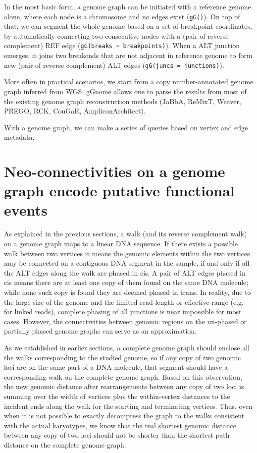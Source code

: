 \documentclass[phd,tocprelim]{cornell}
\begin{document}
In the most basic form, a genome graph can be initiated with a reference genome alone, where each node is a chromosome and no edges exist (\texttt{gG()}). On top of that, we can segment the whole genome based on a set of breakpoint coordinates, by automatically connecting two consecutive nodes with a (pair of reverse complement) REF edge (\texttt{gG(breaks = breakpoints)}). When a ALT junction emerges, it joins two breakends that are not adjacent in reference genome to form new (pair of reverse complement) ALT edges (\texttt{gG(juncs = junctions)}).

More often in practical scenarios, we start from a copy number-annotated genome graph inferred from WGS. gGnome allows one to parse the results from most of the existing genome graph reconstruction methods (JaBbA, ReMixT, Weaver, PREGO, RCK, CouGaR, AmpliconArchitect). 

With a genome graph, we can make a series of queries based on vertex and edge metadata.

\section{Neo-connectivities on a genome graph encode putative functional events}

As explained in the previous sections, a walk (and its reverse complement walk) on a genome graph maps to a linear DNA sequence. If there exists a possible walk between two vertices it means the genomic elements within the two vertices may be connected on a contiguous DNA segment in the sample, if and only if all the ALT edges along the walk are phased in cis. A pair of ALT edges phased in cis means there are at least one copy of them found on the same DNA molecule; while none such copy is found they are deemed phased in trans. In reality, due to the large size of the genome and the limited read-length or effective range (e.g. for linked reads), complete phasing of all junctions is near impossible for most cases. However, the connectivities between genomic regions on the un-phased or partially phased genome graphs can serve as an approximation. 

As we established in earlier sections, a complete genome graph should enclose all the walks corresponding to the studied genome, so if any copy of two genomic loci are on the same part of a DNA molecule, that segment should have a corresponding walk on the complete genome graph. Based on this observation, the new genomic distance after rearrangements between any copy of two loci is summing over the width of vertices plus the within-vertex distances to the incident ends along the walk for the starting and terminating vertices. Thus, even when it is not possible to exactly decompress the graph to the walks consistent with the actual karyotypes, we know that the real shortest genomic distance between any copy of two loci should not be shorter than the shortest path distance on the complete genome graph.
\end{document}
